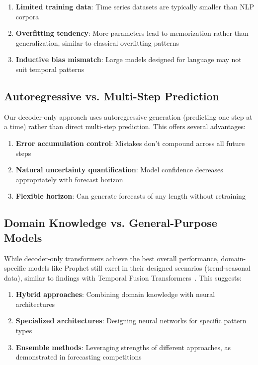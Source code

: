 \documentclass[11pt]{article}
\begin{document}
\begin{enumerate}
\item \textbf{Limited training data}: Time series datasets are typically smaller than NLP corpora
\item \textbf{Overfitting tendency}: More parameters lead to memorization rather than generalization, similar to classical overfitting patterns~\cite{srivastava2014dropout}
\item \textbf{Inductive bias mismatch}: Large models designed for language may not suit temporal patterns
\end{enumerate}

\subsection{Autoregressive vs. Multi-Step Prediction}

Our decoder-only approach uses autoregressive generation (predicting one step at a time) rather than direct multi-step prediction. This offers several advantages:

\begin{enumerate}
\item \textbf{Error accumulation control}: Mistakes don't compound across all future steps
\item \textbf{Natural uncertainty quantification}: Model confidence decreases appropriately with forecast horizon
\item \textbf{Flexible horizon}: Can generate forecasts of any length without retraining
\end{enumerate}

\subsection{Domain Knowledge vs. General-Purpose Models}

While decoder-only transformers achieve the best overall performance, domain-specific models like Prophet still excel in their designed scenarios (trend-seasonal data), similar to findings with Temporal Fusion Transformers~\cite{lim2021temporal}. This suggests:

\begin{enumerate}
\item \textbf{Hybrid approaches}: Combining domain knowledge with neural architectures
\item \textbf{Specialized architectures}: Designing neural networks for specific pattern types
\item \textbf{Ensemble methods}: Leveraging strengths of different approaches, as demonstrated in forecasting competitions~\cite{makridakis2020m4}
\end{enumerate}
\end{document}

